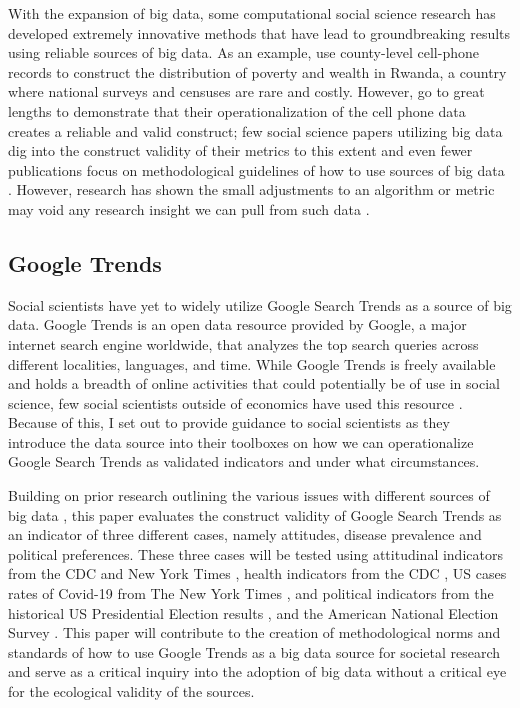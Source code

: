 With the expansion of big data, some computational social science research has
developed extremely innovative methods that have lead to groundbreaking results using 
reliable sources of big data. As an example,\citet{blumenstockPredictingPovertyWealth2015}
use county-level cell-phone records to construct the distribution of poverty
and wealth in Rwanda, a country where national surveys and censuses are
rare and costly. However, \citet{blumenstockPredictingPovertyWealth2015} go to
great lengths to demonstrate that their operationalization of the cell
phone data creates a reliable and valid construct; few social science
papers utilizing big data dig into the construct validity of their
metrics to this extent and even fewer publications focus on
methodological guidelines of how to use sources of big data
\citep[For exceptions, see ][]{asseoTrackingCOVID19Using2020, stilesAssessingCriterionValidity2018}.
However, research has shown the small adjustments to an algorithm or
metric may void any research insight we can pull from such data
\citep{lazerParableGoogleFlu2014}.

\subsection{Google Trends}

Social scientists have yet to widely utilize Google Search Trends as a source of big data.
Google Trends is an open data resource provided by Google, a major internet search
engine worldwide, that analyzes the top search queries across different localities, 
languages, and time. While Google Trends is freely available and holds a breadth of 
online activities that could potentially be of use in social science, few social 
scientists outside of economics have used this resource \citep[see][for examples]{choi2012predicting, jun2018ten,da2011search}. 
Because of this, I set out to provide guidance to social scientists as they introduce
the data source into their toolboxes on how we can operationalize Google Search Trends
as validated indicators and under what circumstances.

Building on prior research outlining the various issues with different sources of big data
\citep{boydCriticalQuestionsBig2012,lazerIssuesConstructValidity2015},
this paper evaluates the construct validity of Google Search Trends as an indicator of three different
cases, namely attitudes, disease prevalence and political preferences.
These three cases will be tested using attitudinal indicators from the %
CDC \citeyearpar{vaches_data} and New York Times \citeyearpar{mask_data}, 
health indicators from the CDC \citeyearpar{suic_data}, 
US cases rates of Covid-19 from The New York Times \citeyearpar{covid_data},  
and political indicators from the historical US Presidential Election results \citeyearpar{pres_data}, 
and the American National Election Survey \citeyearpar{anes_data}. This paper will contribute to the
creation of methodological norms and standards of how to use Google
Trends as a big data source for societal research and serve as a
critical inquiry into the adoption of big data without a critical eye
for the ecological validity of the sources.

